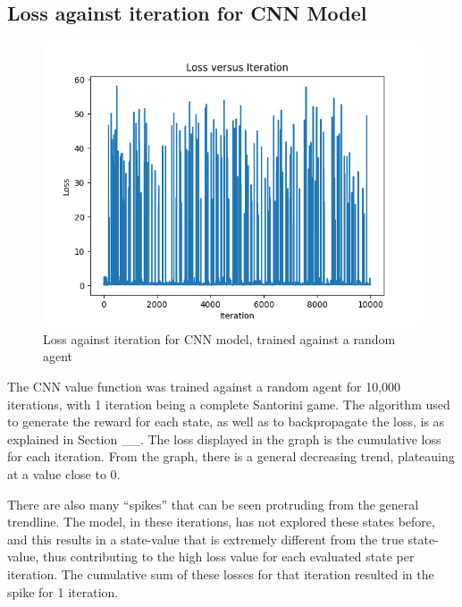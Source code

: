 \documentclass[a4paper,12pt,table]{article}
\begin{document}
\subsection{Loss against iteration for CNN Model}

\begin{figure}[h!]
    \begin{center}
        \includegraphics[scale=0.75]{Pure_CNN.png}
        \caption{Loss against iteration for CNN model, trained against a random agent}
        \label{fig:}
    \end{center}
\end{figure}

The CNN value function was trained against a random agent for 10,000 iterations, with 1 iteration being a complete Santorini game. The algorithm used to generate the reward for each state, as well as to backpropagate the loss, is as explained in Section \_\_. The loss displayed in the graph is the cumulative loss for each iteration. From the graph, there is a general decreasing trend, plateauing at a value close to 0.  \par

There are also many “spikes” that can be seen protruding from the general trendline. The model, in these iterations, has not explored these states before, and this results in a state-value that is extremely different from the true state-value, thus contributing to the high loss value for each evaluated state per iteration. The cumulative sum of these losses for that iteration resulted in the spike for 1 iteration. \par
\end{document}
